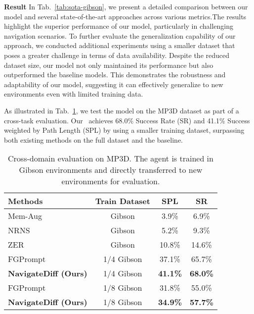 \textbf{Result}
In Tab.~\ref{tab:sota-gibson}, we present a detailed comparison between our model and several state-of-the-art approaches across various metrics.The results highlight the superior performance of our model, particularly in challenging navigation scenarios. To further evaluate the generalization capability of our approach, we conducted additional experiments using a smaller dataset that poses a greater challenge in terms of data availability. Despite the reduced dataset size, our model not only maintained its performance but also outperformed the baseline models. This demonstrates the robustness and adaptability of our model, suggesting it can effectively generalize to new environments even with limited training data. 

As illustrated in Tab.~\ref{tab:cross-domain}, we test the model on the MP3D dataset as part of a cross-task evaluation.  Our \mname  ~achieves 68.0\% Success Rate (SR) and 41.1\% Success weighted by Path Length (SPL) by using a smaller training dataset, surpassing both existing methods on the full dataset and the baseline.

\begin{table}[t]
\centering
\footnotesize
\caption{Cross-domain evaluation on MP3D. The agent is trained in Gibson environments and directly transferred to new environments for evaluation.}
\vspace{-3mm}
\begin{tabular}{@{}lccc@{}}
\toprule
Methods        &               Train Dataset                  & SPL         & SR                  \\ 
\midrule
Mem-Aug~\cite{mezghan2022memory}   & Gibson                       & 3.9\%         & 6.9\%               \\
NRNS~\cite{hahn2021no}         & Gibson                        & 5.2\%         & 9.3\%               \\
ZER~\cite{al2022zero}           & Gibson                         & 10.8\%        & 14.6\%            \\
\midrule
FGPrompt~\cite{sun2024fgprompt}      & 1/4 Gibson                         &37.1\%             & 65.7\%\\ 
\textbf{NavigateDiff (Ours)}            & 1/4 Gibson    & \textbf{41.1\%}   & \textbf{68.0\%}\\ 
\midrule
FGPrompt~\cite{sun2024fgprompt}             & 1/8 Gibson                         &31.8\%             & 55.0\%\\ 
\textbf{NavigateDiff (Ours)}            & 1/8 Gibson    &\textbf{34.9\%}    & \textbf{57.7\%}\\ 
\bottomrule
\end{tabular}
\label{tab:cross-domain}
\end{table}


